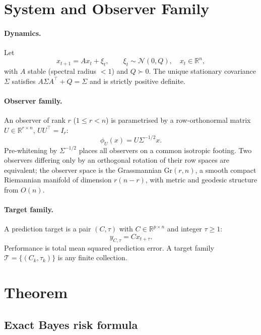 \documentclass[11pt]{article}
\newcommand{\Gr}{\mathrm{Gr}}
\newcommand{\R}{\mathbb{R}}
\begin{document}
\section{System and Observer Family}

\paragraph{Dynamics.}
Let
\begin{equation}
  x_{t+1} = A x_t + \xi_t, \qquad \xi_t \sim \mathcal{N}(0, Q),
  \quad x_t \in \R^n,
\end{equation}
with $A$ stable (spectral radius $<1$) and $Q \succ 0$.
The unique stationary covariance $\Sigma$ satisfies
$A \Sigma A^\top + Q = \Sigma$ and is strictly positive definite.

\paragraph{Observer family.}
An observer of rank $r$ ($1 \le r < n$) is parametrised by a
row-orthonormal matrix $U \in \R^{r \times n}$, $U U^\top = I_r$:
\begin{equation}
  \phi_U(x) = U \Sigma^{-1/2} x.
\end{equation}
Pre-whitening by $\Sigma^{-1/2}$ places all observers on a common isotropic
footing.
Two observers differing only by an orthogonal rotation of their row spaces are
equivalent; the observer space is the Grassmannian
$\Gr(r,n)$, a smooth compact Riemannian manifold of dimension $r(n-r)$,
with metric and geodesic structure from $O(n)$.

\paragraph{Target family.}
A prediction target is a pair $(C, \tau)$ with $C \in \R^{p \times n}$ and
integer $\tau \ge 1$:
\begin{equation}
  y_{C,\tau} = C x_{t+\tau}.
\end{equation}
Performance is total mean squared prediction error.
A target family $\mathcal{T} = \{(C_k, \tau_k)\}$ is any finite collection.

\section{Theorem}

\subsection{Exact Bayes risk formula}
\end{document}
